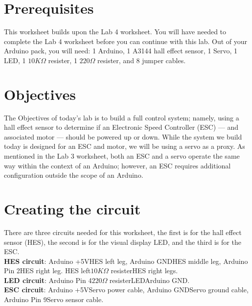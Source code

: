 \documentclass[11pt,a4paper]{article}
\begin{document}
\pagestyle{fancy}

\section*{Prerequisites}
This worksheet builds upon the Lab 4 worksheet. You will have needed to complete the Lab 4 worksheet before you can continue with this lab. Out of your Arduino pack, you will need: 1 Arduino, 1 A3144 hall effect sensor, 1 Servo, 1 LED, 1 $10K\Omega$ resister, 1 $220\Omega$ resister, and 8 jumper cables.

\section*{Objectives}
The Objectives of today's lab is to build a full control system; namely, using a hall effect sensor to determine if an Electronic Speed Controller (ESC) --- and associated motor --- should be powered up or down. While the system we build today is designed for an ESC and motor, we will be using a servo as a proxy. As mentioned in the Lab 3 worksheet, both an ESC and a servo operate the same way within the context of an Arduino; however, an ESC requires additional configuration outside the scope of an Arduino.

\section{Creating the circuit}
\label{sec:circuit}
There are three circuits needed for this worksheet, the first is for the hall effect sensor (HES), the second is for the visual display LED, and the third is for the ESC.\\
\noindent
\textbf{HES circuit}: Arduino +5V\textrightarrow\hspace{0.1em}HES left leg, Arduino GND\textrightarrow\hspace{0.1em}HES middle leg, Arduino Pin 2\textrightarrow\hspace{0.1em}HES right leg. HES left\textrightarrow \hspace{0.1em}$10K\Omega$ resister\textrightarrow\hspace{0.1em}HES right legs.\\
\noindent
\textbf{LED circuit}: Arduino Pin 4\textrightarrow $220\Omega$ resister\textrightarrow LED\textrightarrow Arduino GND.\\
\noindent
\textbf{ESC circuit}: Arduino +5V\textrightarrow Servo power cable, Arduino GND\textrightarrow Servo ground cable, Arduino Pin 9\textrightarrow Servo sensor cable.
\end{document}
